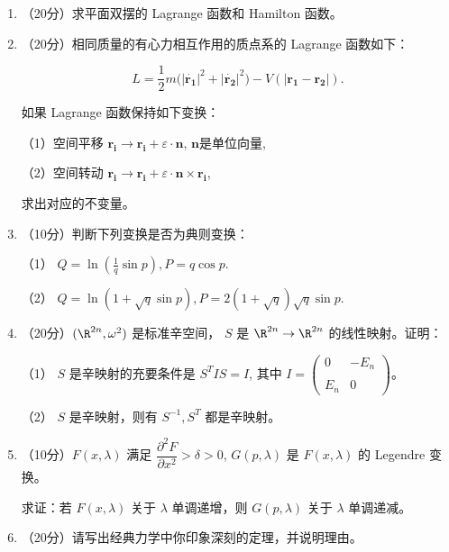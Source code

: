 \begin{enumerate}
\item（20分）求平面双摆的 Lagrange 函数和 Hamilton 函数。

\item（20分）相同质量的有心力相互作用的质点系的 Lagrange 函数如下：

\[
L = \frac{1}{2} m \big( |\dot{\boldsymbol{r_1} }|^2 + |\dot{\boldsymbol{r_2} }|^2 \big) 
-V( |\boldsymbol{r_1}-\boldsymbol{r_2}| ). 
\]

如果 Lagrange 函数保持如下变换：

（1）空间平移 $\boldsymbol{r_i} \rightarrow \boldsymbol{r_i} 
+ \varepsilon \cdot  \boldsymbol{n}$, $\boldsymbol{n}$是单位向量,

（2）空间转动 $\boldsymbol{r_i} \rightarrow \boldsymbol{r_i} 
+ \varepsilon \cdot \boldsymbol{n} \times \boldsymbol{r_i} $,

求出对应的不变量。

\item（10分）判断下列变换是否为典则变换：

 （1） $Q = \ln \left( \frac{1}{q} \sin p \right) , P = q \cos  p$.

 （2） $Q = \ln \left( 1 + \sqrt{q} \sin p \right) , 
 P = 2( 1+\sqrt{q} )\sqrt{q} \sin p $.

\item （20分）$(\R^{2n}, \omega^{2})$ 是标准辛空间，
$S$ 是 $\R^{2n} \rightarrow \R^{2n}$ 的线性映射。证明：

（1） $S$ 是辛映射的充要条件是 $S^{T}IS = I$, 其中 $I = \begin{pmatrix}
   0&-E_n \\ \\
   E_n &0
  \end{pmatrix}$。

（2） $S$ 是辛映射，则有 $S^{-1},S^{T}$ 都是辛映射。

\item（10分）$F(x,\lambda)$ 满足 $\dfrac{\partial^2 F}{\partial x^2}>\delta>0$, 
$G(p,\lambda)$ 是 $F(x,\lambda)$ 的 Legendre 变换。

求证：若 $F(x,\lambda)$ 关于 $\lambda$ 单调递增，则 $G(p,\lambda)$ 关于 $\lambda$ 单调递减。

\item（20分）请写出经典力学中你印象深刻的定理，并说明理由。
\end{enumerate}

